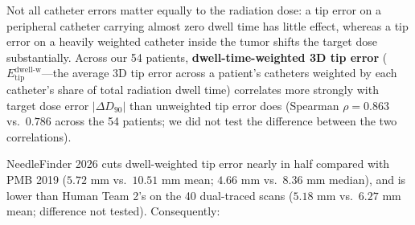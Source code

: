 \documentclass[
  11pt,
]{article}
\begin{document}
Not all catheter errors matter equally to the radiation dose: a tip
error on a peripheral catheter carrying almost zero dwell time has
little effect, whereas a tip error on a heavily weighted catheter inside
the tumor shifts the target dose substantially. Across our 54 patients,
\textbf{dwell-time-weighted 3D tip error}
(\(E_{\text{tip}}^{\text{dwell-w}}\)---the average 3D tip error across a
patient's catheters weighted by each catheter's share of total radiation
dwell time) correlates more strongly with target dose error
\(|\Delta D_{90}|\) than unweighted tip error does (Spearman
\(\rho = 0.863\) vs.~\(0.786\) across the 54 patients; we did not test
the difference between the two correlations).

NeedleFinder 2026 cuts dwell-weighted tip error nearly in half compared
with PMB 2019 (\(5.72\text{ mm}\) vs.~\(10.51\text{ mm}\) mean;
\(4.66\text{ mm}\) vs.~\(8.36\text{ mm}\) median), and is lower than
Human Team 2's on the 40 dual-traced scans (\(5.18\text{ mm}\)
vs.~\(6.27\text{ mm}\) mean; difference not tested). Consequently:
\end{document}

